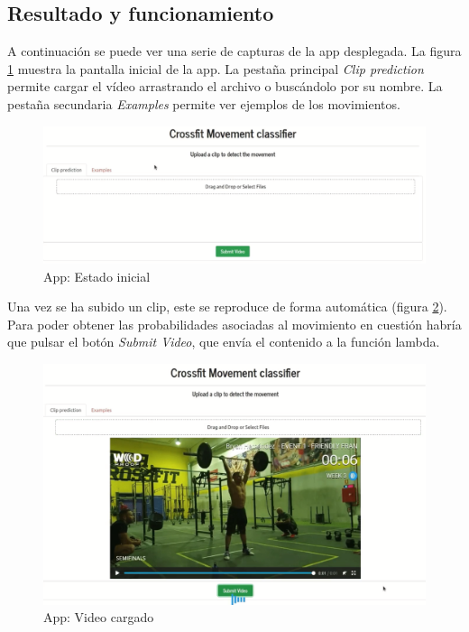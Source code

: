 \subsection{Resultado y funcionamiento}

A continuación se puede ver una serie de capturas de la app desplegada. La figura \ref{app_1} muestra la pantalla inicial de la app. La pestaña principal \textit{Clip prediction} permite cargar el vídeo arrastrando el archivo o buscándolo por su nombre. La pestaña secundaria \textit{Examples} permite ver ejemplos de los movimientos. 

\begin{figure}[H]
    \centering
		\includegraphics[width=\textwidth]{figs/app_1.png}
\caption{App: Estado inicial}\label{app_1}
\end{figure}

Una vez se ha subido un clip, este se reproduce de forma automática (figura \ref{app_2}). Para poder obtener las probabilidades asociadas al movimiento en cuestión habría que pulsar el botón \textit{Submit Video}, que envía el contenido a la función lambda.

\begin{figure}[H]
    \centering
		\includegraphics[width=\textwidth]{figs/app_2.png}
\caption{App: Video cargado}\label{app_2}
\end{figure}

